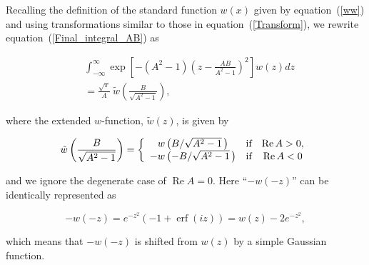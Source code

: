\documentclass[draft]{agujournal2019}
\begin{document}
{Recalling the definition of the standard function $w(x)$ given by
equation~(\ref{ww}) and using transformations similar to those in
equation~(\ref{Transform}), we rewrite equation~(\ref{Final_integral_AB}) as
\begin{linenomath*}
\begin{align}
&  \int_{-\infty}^{\infty}\exp\left[  -\left(  A^{2}-1\right)  
\left(z-\frac{AB}{A^{2}-1}\right)  ^{2}\right]  w\left(  z\right)  dz\nonumber \\
&  =\frac{\sqrt{\pi}}{A}\ \tilde{w}\left(  \frac{B}{\sqrt{A^{2}-1}}\right),
\label{Final_integral_w()}
\end{align}
\end{linenomath*}
where the extended $w$-function, $\tilde{w}(z)$, is given by
\begin{linenomath*}
\begin{equation}
\tilde{w}\left(  \frac{B}{\sqrt{A^{2}-1}}\right)  =\left\{
\begin{array}
[c]{ccc}%
w\left(  {B}/{\sqrt{A^{2}-1}}\,\right)   & \text{if} & \operatorname{Re}%
A>0,\\
-w\left(  - {B}/{\sqrt{A^{2}-1}}\,\right)   & \text{if} & \operatorname{Re}A<0
\label{tilde_w}
\end{array}
\right.
\end{equation}
\end{linenomath*}
and we ignore the degenerate case of $\operatorname{Re}A=0$. Here ``$-w(-z)$'' can be identically represented as
\begin{linenomath*}
\begin{equation*}
-w(-z)=e^{-z^{2}}(-1+\operatorname{erf}(iz))
=w(z)-2e^{-z^{2}},
\end{equation*}
\end{linenomath*}
which means that $-w(-z)$ is shifted from $w(z)$ by a simple Gaussian function.

}
\end{document}

